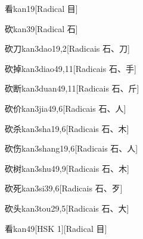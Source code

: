 \begin{entry}{看}{kan1}{9}[Radical ⽬]
\end{entry}

\begin{entry}{砍}{kan3}{9}[Radical ⽯]
\end{entry}

\begin{entry}{砍刀}{kan3dao1}{9,2}[Radicais ⽯、⼑]
\end{entry}

\begin{entry}{砍掉}{kan3diao4}{9,11}[Radicais ⽯、⼿]
\end{entry}

\begin{entry}{砍断}{kan3duan4}{9,11}[Radicais ⽯、⽄]
\end{entry}

\begin{entry}{砍价}{kan3jia4}{9,6}[Radicais ⽯、⼈]
\end{entry}

\begin{entry}{砍杀}{kan3sha1}{9,6}[Radicais ⽯、⽊]
\end{entry}

\begin{entry}{砍伤}{kan3shang1}{9,6}[Radicais ⽯、⼈]
\end{entry}

\begin{entry}{砍树}{kan3shu4}{9,9}[Radicais ⽯、⽊]
\end{entry}

\begin{entry}{砍死}{kan3si3}{9,6}[Radicais ⽯、⽍]
\end{entry}

\begin{entry}{砍头}{kan3tou2}{9,5}[Radicais ⽯、⼤]
\end{entry}

\begin{entry}{看}{kan4}{9}[HSK 1][Radical ⽬]
\end{entry}


